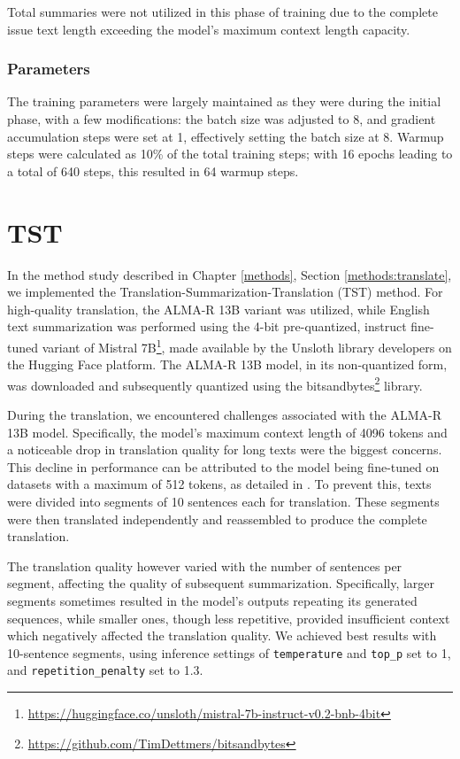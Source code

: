 \documentclass[english, ba, kiv, he, iso690numb, pdf, viewonly]{fasthesis}
\begin{document}
Total summaries were not utilized in this phase of training due to the complete issue text length exceeding the model's maximum context length capacity.
\subsubsection{Parameters}
The training parameters were largely maintained as they were during the initial phase, with a few modifications: the batch size was adjusted to 8, and gradient accumulation steps were set at 1, effectively setting the batch size at 8. Warmup steps were calculated as 10\% of the total training steps; with 16 epochs leading to a total of 640 steps, this resulted in 64 warmup steps.

\section{TST}
In the method study described in Chapter \ref{methods}, Section \ref{methods:translate}, we implemented the Translation-Summarization-Translation (TST) method. For high-quality translation, the ALMA-R 13B variant was utilized, while English text summarization was performed using the 4-bit pre-quantized, instruct fine-tuned variant of Mistral 7B\footnote{\url{https://huggingface.co/unsloth/mistral-7b-instruct-v0.2-bnb-4bit}}, made available by the Unsloth library developers on the Hugging Face platform. The ALMA-R 13B model, in its non-quantized form, was downloaded and subsequently quantized using the bitsandbytes\footnote{\url{https://github.com/TimDettmers/bitsandbytes}} library.

During the translation, we encountered challenges associated with the ALMA-R 13B model. Specifically, the model's maximum context length of 4096 tokens and a noticeable drop in translation quality for long texts were the biggest concerns. This decline in performance can be attributed to the model being fine-tuned on datasets with a maximum of 512 tokens, as detailed in \cite{xu2024contrastive}. To prevent this, texts were divided into segments of 10 sentences each for translation. These segments were then translated independently and reassembled to produce the complete translation. 

The translation quality however varied with the number of sentences per segment, affecting the quality of subsequent summarization. Specifically, larger segments sometimes resulted in the model's outputs repeating its generated sequences, while smaller ones, though less repetitive, provided insufficient context which negatively affected the translation quality. We achieved best results with 10-sentence segments, using inference settings of \texttt{temperature} and \texttt{top\_p} set to 1, and \texttt{repetition\_penalty} set to 1.3.
\end{document}
